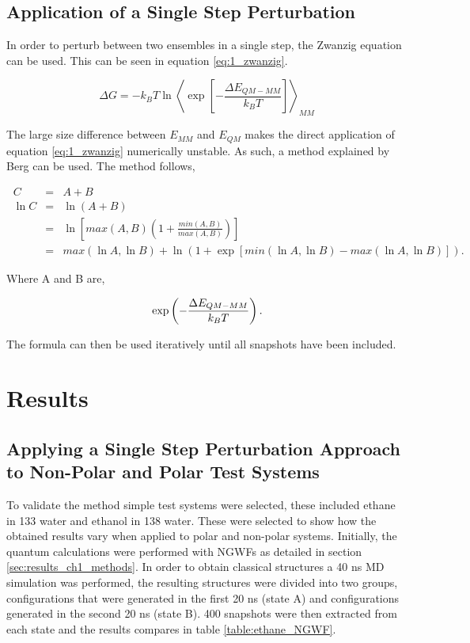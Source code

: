 \subsection{Application of a Single Step Perturbation}

In order to perturb between two ensembles in a single step, the Zwanzig equation can be used.  This can be seen in equation \ref{eq:1_zwanzig}.

\begin{equation} \label{eq:1_zwanzig}
\ \Delta G = -k_B T  \ln \left\langle \exp \left[ - \frac{\Delta E_{QM-MM}}{k_BT} \right] \right\rangle_{MM}
\end{equation}


The large size difference between $E_{MM}$ and $E_{QM}$ makes the direct application of equation \ref{eq:1_zwanzig} numerically unstable.  As such, a method explained by Berg \cite{Berg_maths} can be used.  The method follows,

\begin{eqnarray}
\ C &=& A + B \\
\ \ln C &=& \ln (A+B) \\
\ &=& \ln \left[ max(A, B) \left( 1+ \frac{min(A, B)}{max(A, B)} \right)  \right] \\ \label{eq:berg}
\ &=& max(\ln A, \ln B)+ \ln(1+ \exp[min(\ln A, \ln B) - max ( \ln A, \ln B)]) .
\end{eqnarray}

Where A and B are,

\begin{equation}
\ \exp \left( - \frac{\Delta E_{QM-MM}}{k_BT}  \right) \\.
\end{equation}

The formula can then be used iteratively until all snapshots have been included.

\section{Results}

\subsection{Applying a Single Step Perturbation Approach to Non-Polar and Polar Test Systems} \label{sec:direct_application_of_single_step}

To validate the method simple test systems were selected, these included ethane in 133 water and ethanol in 138 water.  These were selected to show how the obtained results vary when applied to polar and non-polar systems.  Initially, the quantum calculations were performed with NGWFs as detailed in section \ref{sec:results_ch1_methods}.  In order to obtain classical structures a 40 ns MD simulation was performed, the resulting structures were divided into two groups, configurations that were generated in the first 20 ns (state A) and configurations generated in the second 20 ns (state B).  400 snapshots were then extracted from each state and the results compares in table \ref{table:ethane_NGWF}.

